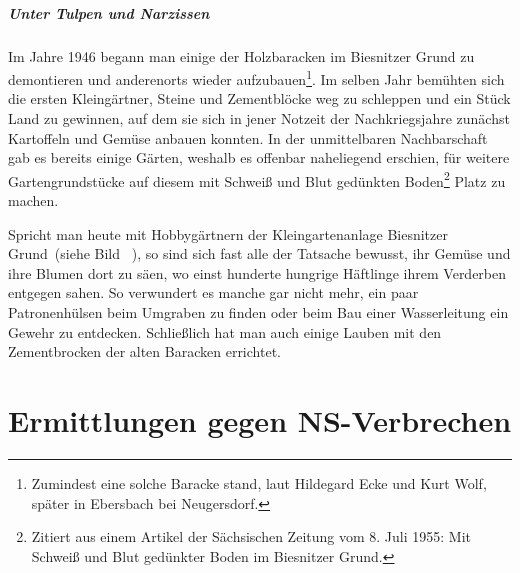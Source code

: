 \documentclass[a4paper,12pt,ngerman,
]{nisebook}
\begin{document}


\paragraph{Unter Tulpen und Narzissen}
Im Jahre 1946 begann man einige der Holzbaracken im Biesnitzer Grund zu demontieren und anderenorts wieder aufzubauen\footnote{Zumindest eine solche Baracke stand, laut Hildegard Ecke und Kurt Wolf, später in Ebersbach bei Neugersdorf.}. Im selben Jahr bemühten sich die ersten Kleingärtner, Steine und Zementblöcke weg zu schleppen und ein Stück Land zu gewinnen, auf dem sie sich in jener Notzeit der Nachkriegsjahre zunächst Kartoffeln und Gemüse anbauen konnten. In der unmittelbaren Nachbarschaft gab es bereits einige Gärten, weshalb es offenbar naheliegend erschien, für weitere Gartengrundstücke auf diesem mit \glqq Schweiß und Blut gedünkten Boden\grqq\footnote{Zitiert aus einem Artikel der Sächsischen Zeitung vom 8. Juli 1955: Mit Schweiß und Blut gedünkter Boden im Biesnitzer Grund.} Platz zu machen.

\newpage
Spricht man heute mit Hobbygärtnern der Kleingartenanlage \glqq Biesnitzer Grund\grqq~(siehe Bild ~), so sind sich fast alle der Tatsache bewusst, ihr Gemüse und ihre Blumen dort zu säen, wo einst hunderte hungrige Häftlinge ihrem Verderben entgegen sahen. So verwundert es manche gar nicht mehr, ein paar Patronenhülsen beim Umgraben zu finden oder beim Bau einer Wasserleitung ein Gewehr zu entdecken. Schließlich hat man auch einige Lauben mit den Zementbrocken der alten Baracken errichtet.



 
\chapter{Ermittlungen gegen NS-Verbrechen}
\end{document}
